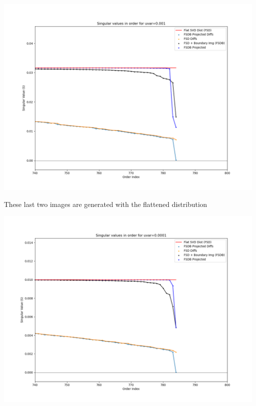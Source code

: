 \includegraphics[width=14cm]{c4_figures/e05-SVD-uniform-rand_diff-decision_boundary_uvar-0.001-index-0-image-999-cropped.png}


These last two images are generated with the flattened distribution 

\includegraphics[width=14cm]{c4_figures/e06-SVD-uniform-rand_diff-decision_boundary_uvar-0.0001-index-0-image-999-cropped.png}

